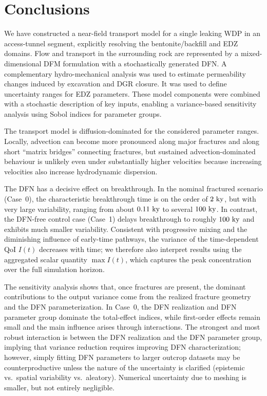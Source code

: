 \section{Conclusions}
\label{sec:conclusions}

We have constructed a near-field transport model for a single leaking
\gls{WDP} in an access-tunnel segment, explicitly resolving the
bentonite/backfill and EDZ domains. Flow and transport in the surrounding rock
are represented by a mixed-dimensional \gls{DFM} formulation with a
stochastically generated \gls{DFN}. A complementary hydro-mechanical analysis
was used to estimate permeability changes induced  by excavation and
\gls{DGR} closure. It was used to define uncertainty ranges for EDZ parameters.
These model components were combined with a stochastic description of key
inputs, enabling a variance-based sensitivity analysis using Sobol indices for
parameter groups.

The transport model is diffusion-dominated for the considered parameter ranges.
Locally, advection can become more pronounced along major fractures and along
short ``matrix bridges'' connecting fractures, but sustained
advection-dominated behaviour is unlikely even under substantially higher
velocities because increasing velocities also increase hydrodynamic dispersion.

The DFN has a decisive effect on breakthrough. In the nominal fractured
scenario (Case~0), the characteristic breakthrough time is on the order of
$2\,\,\mathrm{ky}$, but with very large variability, ranging from about
$0.11\,\,\mathrm{ky}$ to several $100\,\,\mathrm{ky}$. In contrast, the DFN-free
control case (Case~1) delays breakthrough to roughly $100\,\,\mathrm{ky}$ and
exhibits much smaller variability. Consistent with progressive mixing and the
diminishing influence of early-time pathways, the variance of the time-dependent
\gls{QoI} $I(t)$ decreases with time; we therefore also interpret results using
the aggregated scalar quantity $\max I(t)$, which captures the peak
concentration over the full simulation horizon.

The sensitivity analysis shows that, once fractures are present, the dominant
contributions to the output variance come from the realized fracture geometry
and the DFN parameterization. In Case~0, the DFN realization and DFN parameter
group dominate the total-effect indices, while first-order effects remain small
and the main influence arises through interactions. The strongest and most
robust interaction is between the DFN realization and the DFN parameter group,
implying that variance reduction requires improving DFN characterization;
however, simply fitting DFN parameters to larger outcrop datasets may be
counterproductive unless the nature of the uncertainty is clarified
(epistemic vs.\ spatial variability vs.\ aleatory). Numerical uncertainty due
to meshing is smaller, but not entirely negligible.

